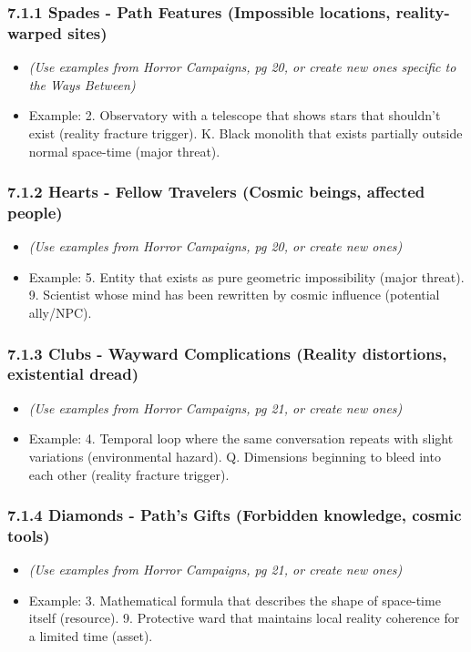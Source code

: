 \documentclass[11pt]{article}
\begin{document}
\subsubsection*{7.1.1 Spades - Path Features (Impossible locations, reality-warped sites)}
\begin{itemize}
\item \textit{(Use examples from Horror Campaigns, pg 20, or create new ones specific to the Ways Between)}
\item Example: 2. Observatory with a telescope that shows stars that shouldn't exist (reality fracture trigger). K. Black monolith that exists partially outside normal space-time (major threat).
\end{itemize}

\subsubsection*{7.1.2 Hearts - Fellow Travelers (Cosmic beings, affected people)}
\begin{itemize}
\item \textit{(Use examples from Horror Campaigns, pg 20, or create new ones)}
\item Example: 5. Entity that exists as pure geometric impossibility (major threat). 9. Scientist whose mind has been rewritten by cosmic influence (potential ally/NPC).
\end{itemize}

\subsubsection*{7.1.3 Clubs - Wayward Complications (Reality distortions, existential dread)}
\begin{itemize}
\item \textit{(Use examples from Horror Campaigns, pg 21, or create new ones)}
\item Example: 4. Temporal loop where the same conversation repeats with slight variations (environmental hazard). Q. Dimensions beginning to bleed into each other (reality fracture trigger).
\end{itemize}

\subsubsection*{7.1.4 Diamonds - Path's Gifts (Forbidden knowledge, cosmic tools)}
\begin{itemize}
\item \textit{(Use examples from Horror Campaigns, pg 21, or create new ones)}
\item Example: 3. Mathematical formula that describes the shape of space-time itself (resource). 9. Protective ward that maintains local reality coherence for a limited time (asset).
\end{itemize}
\end{document}

